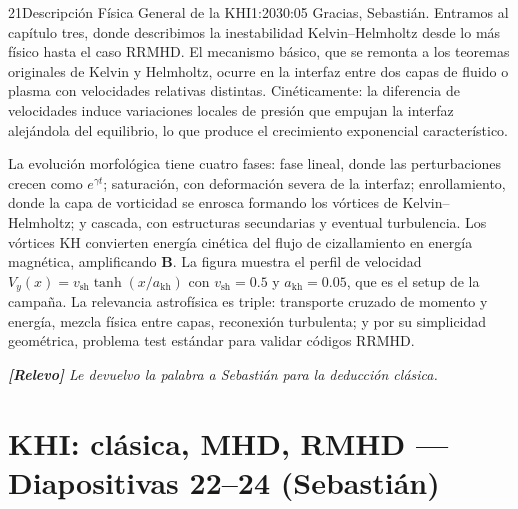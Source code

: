 \documentclass[11pt,a4paper]{article}
\newcommand{\relevo}[1]{%
  \par\medskip
  \noindent\colorbox{tagbg}{\parbox{\dimexpr\linewidth-2\fboxsep\relax}{%
    \small\itshape \textbf{[Relevo]} #1}}\par\medskip}
\begin{document}
\begin{bryorador}{21}{Descripción Física General de la KHI}{1:20}{30:05}
Gracias, Sebastián. Entramos al capítulo tres, donde describimos la
inestabilidad Kelvin--Helmholtz desde lo más físico hasta el caso RRMHD. El
mecanismo básico, que se remonta a los teoremas originales de Kelvin y
Helmholtz, ocurre en la interfaz entre dos capas de fluido o plasma con
velocidades relativas distintas. Cinéticamente: la diferencia de velocidades
induce variaciones locales de presión que empujan la interfaz alejándola del
equilibrio, lo que produce el crecimiento exponencial característico.

La evolución morfológica tiene cuatro fases: fase lineal, donde las
perturbaciones crecen como $e^{\gamma t}$; saturación, con deformación severa
de la interfaz; enrollamiento, donde la capa de vorticidad se enrosca
formando los vórtices de Kelvin--Helmholtz; y cascada, con estructuras
secundarias y eventual turbulencia. Los vórtices KH convierten energía
cinética del flujo de cizallamiento en energía magnética, amplificando
$\mathbf{B}$. La figura muestra el perfil de velocidad
$V_y(x)=v_\text{sh}\tanh(x/a_\text{kh})$ con $v_\text{sh}=0.5$ y
$a_\text{kh}=0.05$, que es el setup de la campaña. La relevancia astrofísica
es triple: transporte cruzado de momento y energía, mezcla física entre
capas, reconexión turbulenta; y por su simplicidad geométrica, problema test
estándar para validar códigos RRMHD.
\relevo{Le devuelvo la palabra a Sebastián para la deducción clásica.}
\end{bryorador}

\section{KHI: clásica, MHD, RMHD --- Diapositivas 22--24 (Sebastián)}
\end{document}
